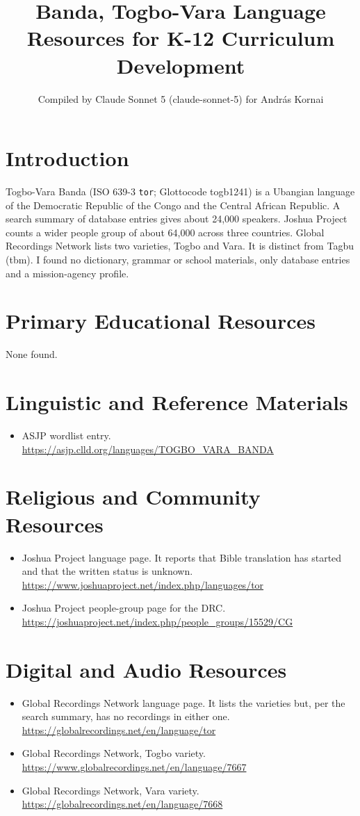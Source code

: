 \documentclass[12pt]{article}
\title{Banda, Togbo-Vara Language Resources for K-12 Curriculum Development}
\author{Compiled by Claude Sonnet 5 (claude-sonnet-5) for Andr\'as Kornai}
\date{}
\begin{document}
\maketitle

\section{Introduction}
Togbo-Vara Banda (ISO 639-3 \texttt{tor}; Glottocode togb1241) is a Ubangian language of the Democratic Republic of the Congo and the Central African Republic. A search summary of database entries gives about 24,000 speakers. Joshua Project counts a wider people group of about 64,000 across three countries. Global Recordings Network lists two varieties, Togbo and Vara. It is distinct from Tagbu (tbm). I found no dictionary, grammar or school materials, only database entries and a mission-agency profile.

\section{Primary Educational Resources}
None found.

\section{Linguistic and Reference Materials}
\begin{itemize}
\item ASJP wordlist entry. \url{https://asjp.clld.org/languages/TOGBO_VARA_BANDA}
\end{itemize}

\section{Religious and Community Resources}
\begin{itemize}
\item Joshua Project language page. It reports that Bible translation has started and that the written status is unknown. \url{https://www.joshuaproject.net/index.php/languages/tor}
\item Joshua Project people-group page for the DRC. \url{https://joshuaproject.net/index.php/people_groups/15529/CG}
\end{itemize}

\section{Digital and Audio Resources}
\begin{itemize}
\item Global Recordings Network language page. It lists the varieties but, per the search summary, has no recordings in either one. \url{https://globalrecordings.net/en/language/tor}
\item Global Recordings Network, Togbo variety. \url{https://www.globalrecordings.net/en/language/7667}
\item Global Recordings Network, Vara variety. \url{https://globalrecordings.net/en/language/7668}
\end{itemize}
\end{document}
